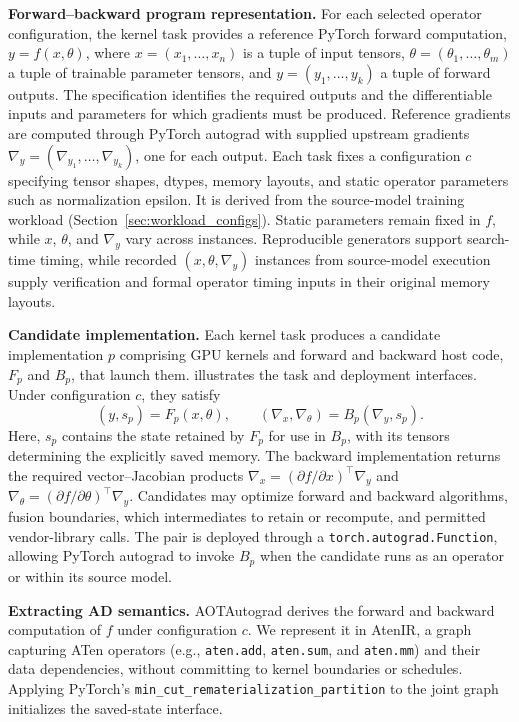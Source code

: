 \noindent
\textbf{Forward--backward program representation.}
For each selected operator configuration, the kernel task provides a reference PyTorch forward computation, $y=f(x,\theta)$, where $x=(x_1,\ldots,x_n)$ is a tuple of input tensors, $\theta=(\theta_1,\ldots,\theta_m)$ a tuple of trainable parameter tensors, and $y=(y_1,\ldots,y_k)$ a tuple of forward outputs. The specification identifies the required outputs and the differentiable inputs and parameters for which gradients must be produced. Reference gradients are computed through PyTorch autograd with supplied upstream gradients $\nabla_y=(\nabla_{y_1},\ldots,\nabla_{y_k})$, one for each output. Each task fixes a configuration $c$ specifying tensor shapes, dtypes, memory layouts, and static operator parameters such as normalization epsilon. It is derived from the source-model training workload (Section~\ref{sec:workload_configs}). Static parameters remain fixed in $f$, while $x$, $\theta$, and $\nabla_y$ vary across instances. Reproducible generators support search-time timing, while recorded $(x,\theta,\nabla_y)$ instances from source-model execution supply verification and formal operator timing inputs in their original memory layouts.

\noindent\textbf{Candidate implementation.}
Each kernel task produces a candidate implementation $p$ comprising GPU kernels and forward and backward host code, $F_p$ and $B_p$, that launch them.  illustrates the task and deployment interfaces. Under configuration $c$, they satisfy
\begin{equation}
    (y,s_p)=F_p(x,\theta), \qquad
    (\nabla_x,\nabla_\theta)=B_p(\nabla_y,s_p).
    \label{eq:autograd_contract}
\end{equation}
Here, $s_p$ contains the state retained by $F_p$ for use in $B_p$, with its tensors determining the explicitly saved memory. The backward implementation returns the required vector--Jacobian products $\nabla_x=(\partial f/\partial x)^{\top}\nabla_y$ and $\nabla_\theta=(\partial f/\partial\theta)^{\top}\nabla_y$. Candidates may optimize forward and backward algorithms, fusion boundaries, which intermediates to retain or recompute, and permitted vendor-library calls. The pair is deployed through a \texttt{torch.autograd.Function}, allowing PyTorch autograd to invoke $B_p$ when the candidate runs as an operator or within its source model.

\noindent\textbf{Extracting AD semantics.}
AOTAutograd derives the forward and backward computation of $f$ under configuration $c$. We represent it in AtenIR, a graph capturing ATen operators (e.g., \texttt{aten.add}, \texttt{aten.sum}, and \texttt{aten.mm}) and their data dependencies, without committing to kernel boundaries or schedules. Applying PyTorch's \texttt{min\_cut\_rematerialization\_partition} to the joint graph initializes the saved-state interface.

